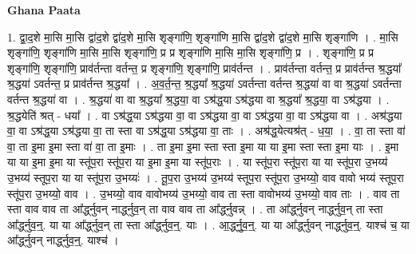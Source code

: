 \documentclass[17pt]{extarticle}
\begin{document}
\textbf{Ghana Paata } \newline

1. द्वा॒द॒शे मा॒सि मा॒सि द्वा॑द॒शे द्वा॑द॒शे मा॒सि शृङ्गा॑णि॒ शृङ्गा॑णि मा॒सि द्वा॑द॒शे द्वा॑द॒शे मा॒सि शृङ्गा॑णि । . मा॒सि शृङ्गा॑णि॒ शृङ्गा॑णि मा॒सि मा॒सि शृङ्गा॑णि॒ प्र प्र शृङ्गा॑णि मा॒सि मा॒सि शृङ्गा॑णि॒ प्र । . शृङ्गा॑णि॒ प्र प्र शृङ्गा॑णि॒ शृङ्गा॑णि॒ प्राव॑र्तन्ता वर्तन्त॒ प्र शृङ्गा॑णि॒ शृङ्गा॑णि॒ प्राव॑र्तन्त । . प्राव॑र्तन्ता वर्तन्त॒ प्र प्राव॑र्तन्त श्र॒द्धया᳚ श्र॒द्धया॑ ऽवर्तन्त॒ प्र प्राव॑र्तन्त श्र॒द्धया᳚ । . अ॒व॒र्त॒न्त॒ श्र॒द्धया᳚ श्र॒द्धया॑ ऽवर्तन्ता वर्तन्त श्र॒द्धया॑ वा वा श्र॒द्धया॑ ऽवर्तन्ता वर्तन्त श्र॒द्धया॑ वा । . श्र॒द्धया॑ वा वा श्र॒द्धया᳚ श्र॒द्धया॒ वा ऽश्र॑द्ध॒या ऽश्र॑द्धया वा श्र॒द्धया᳚ श्र॒द्धया॒ वा ऽश्र॑द्धया । . श्र॒द्धयेति॑ श्रत् - धया᳚ । . वा ऽश्र॑द्ध॒या ऽश्र॑द्धया वा॒ वा ऽश्र॑द्धया वा॒ वा ऽश्र॑द्धया वा॒ वा ऽश्र॑द्धया वा । . अश्र॑द्धया वा॒ वा ऽश्र॑द्ध॒या ऽश्र॑द्धया वा॒ ता स्ता वा ऽश्र॑द्ध॒या ऽश्र॑द्धया वा॒ ताः । . अश्र॑द्ध॒येत्यश्र॑त् - ध॒या॒ । . वा॒ ता स्ता वा॑ वा॒ ता इ॒मा इ॒मा स्ता वा॑ वा॒ ता इ॒माः । . ता इ॒मा इ॒मा स्ता स्ता इ॒मा या या इ॒मा स्ता स्ता इ॒मा याः । . इ॒मा या या इ॒मा इ॒मा या स्तू॑प॒रा स्तू॑प॒रा या इ॒मा इ॒मा या स्तू॑प॒राः । . या स्तू॑प॒रा स्तू॑प॒रा या या स्तू॑प॒रा उ॒भय्य॑ उ॒भय्य॑ स्तूप॒रा या या स्तू॑प॒रा उ॒भय्यः॑ । . तू॒प॒रा उ॒भय्य॑ उ॒भय्य॑ स्तूप॒रा स्तू॑प॒रा उ॒भय्यो॒ वाव वावो भय्य॑ स्तूप॒रा स्तू॑प॒रा उ॒भय्यो॒ वाव । . उ॒भय्यो॒ वाव वावोभय्य॑ उ॒भय्यो॒ वाव ता स्ता वावोभय्य॑ उ॒भय्यो॒ वाव ताः । . वाव ता स्ता वाव वाव ता आ᳚र्द्ध्नुवन् नार्द्ध्नुव॒न् ता वाव वाव ता आ᳚र्द्ध्नुवन्न् । . ता आ᳚र्द्ध्नुवन् नार्द्ध्नुव॒न् ता स्ता आ᳚र्द्ध्नुव॒न्॒. या या आ᳚र्द्ध्नुव॒न् ता स्ता आ᳚र्द्ध्नुव॒न्॒. याः । . आ॒र्द्ध्नु॒व॒न्॒. या या आ᳚र्द्ध्नुवन् नार्द्ध्नुव॒न्॒. याश्च॑ च॒ या आ᳚र्द्ध्नुवन् नार्द्ध्नुव॒न्॒. याश्च॑ । \newline
\end{document}
